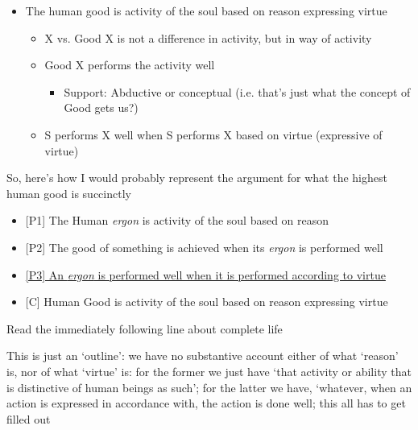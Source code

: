 \documentclass[11pt]{article}
\begin{document}
\begin{itemize}
\item{The human good is activity of the soul based on reason expressing virtue}
\begin{itemize}\item{X vs. Good X is not a difference in activity, but in way of activity}\item{Good X performs the activity well}\begin{itemize}\item{Support: Abductive or conceptual (i.e. that's just what the concept of Good gets us?)}\end{itemize}\item{S performs X well when S performs X based on virtue (expressive of virtue)}\end{itemize}\end{itemize}

\noindent So, here's how I would probably represent the argument for what the highest human good is succinctly

\begin{itemize}\item{[P1] The Human \emph{ergon} is activity of the soul based on reason}
\item{[P2] The good of something is achieved when its \emph{ergon} is performed well}\item{\underline{[P3] An \emph{ergon} is performed well when it is performed according to virtue}}
\item{[C] Human Good is activity of the soul based on reason expressing virtue}

\end{itemize}

\noindent Read the immediately following line about complete life
\vspace*{5mm}

\noindent This is just an `outline': we have no substantive account either of what `reason' is, nor of what `virtue' is: for the former we just have `that activity or ability that is distinctive of human beings as such'; for the latter we have, `whatever, when an action is expressed in accordance with, the action is done well; this all has to get filled out
\end{document}
